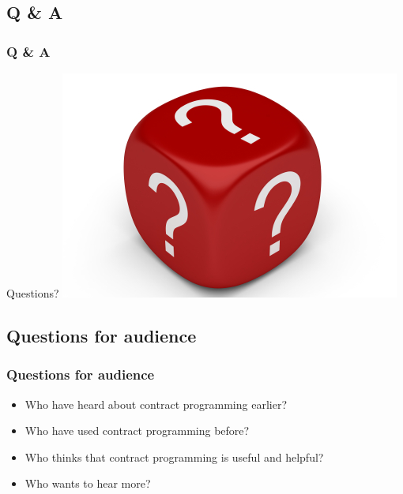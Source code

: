 \documentclass{beamer}
\begin{document}
\subsection{Q \& A}
\begin{frame}
\frametitle{Q \& A}
\begin{center}
\Huge Questions?
\includegraphics[scale=0.45]{dice_questions}
\end{center}
\end{frame}


\subsection{Questions for audience}
\begin{frame}
\frametitle{Questions for audience}
\begin{itemize}[<+->]
  \item Who have heard about contract programming earlier?
  \item Who have used contract programming before?
  \item Who thinks that contract programming is useful and helpful?
  \item Who wants to hear more?
\end{itemize}
\end{frame}
\end{document}
